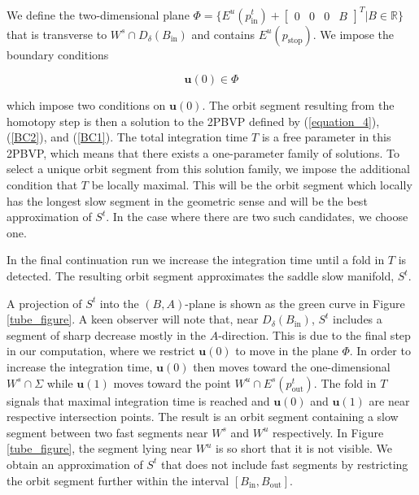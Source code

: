 \documentclass{ws-ijbc}
\begin{document}
We define the two-dimensional plane $\Phi = \{E^u(p^t_{\mathrm{in}}) + \begin{bmatrix} 0 & 0 & 0 & B \end{bmatrix}^{T}| B \in \mathbb{R} \}$ that is transverse to $W^s \cap D_{\delta}(B_{\mathrm{in}})$ and contains $E^u(p_{\text{stop}})$.  We impose the boundary conditions
    
\begin{equation}
\mathbf{u}(0) \in \Phi
\label{BC1}
\end{equation}
    
\noindent
which impose two conditions on $\mathbf{u}(0)$.  The orbit segment resulting from the homotopy step is then a solution to the 2PBVP defined by (\ref{equation_4}), (\ref{BC2}), and (\ref{BC1}).  The total integration time $T$ is a free parameter in this 2PBVP, which means that there exists a one-parameter family of solutions.  To select a unique orbit segment from this solution family, we impose the additional condition that $T$ be locally maximal.  This will be the orbit segment which locally has the longest slow segment in the geometric sense and will be the best approximation of $S^t$.  In the case where there are two such candidates, we choose one.
    
In the final continuation run we increase the integration time until a fold in $T$ is detected.  The resulting orbit segment approximates the saddle slow manifold, $S^t$.
   
A projection of $S^t$ into the $(B,A)$-plane is shown as the green curve in Figure \ref{tube_figure}.  A keen observer will note that, near $D_\delta(B_{\mathrm{in}})$, $S^t$ includes a segment of sharp decrease mostly in the $A$-direction.  This is due to the final step in our computation, where we restrict $\mathbf{u}(0)$ to move in the plane $\Phi$.  In order to increase the integration time, $\mathbf{u}(0)$ then moves toward the one-dimensional $W^s \cap \Sigma$ while $\mathbf{u}(1)$ moves toward the point $W^u \cap E^s(p^t_{\mathrm{out}})$.  The fold in $T$ signals that maximal integration time is reached and $\mathbf{u}(0)$ and $\mathbf{u}(1)$ are near respective intersection points. The result is an orbit segment containing a slow segment between two fast segments near $W^s$ and $W^u$ respectively.  In Figure \ref{tube_figure}, the segment lying near $W^u$ is so short that it is not visible.  We obtain an approximation of $S^t$ that does not include fast segments by restricting the orbit segment further within the interval $[B_{\mathrm{in}},B_{\mathrm{out}}]$.
   
\end{document}
